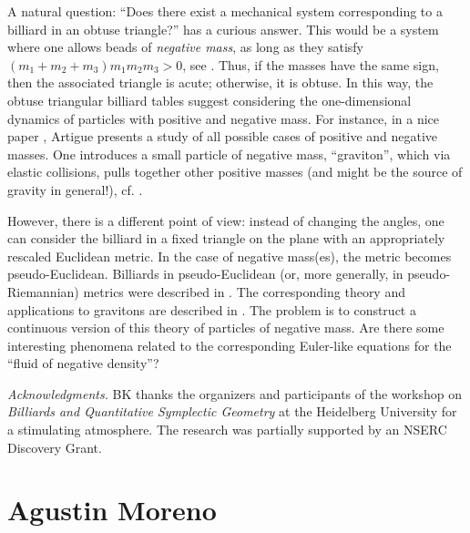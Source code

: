 \documentclass[11pt]{article}
\theoremstyle{definition}
\begin{document}
A natural question: ``Does there exist a mechanical system corresponding to a billiard in an obtuse triangle?'' has a curious answer. This would be a system where one allows beads of {\it negative mass}, as long as they satisfy $(m_1 + m_2 + m_3)m_1 m_2 m_3 > 0$, see \cite{GlashowMittag}. Thus, if the masses have the same sign, then the associated triangle is acute; otherwise, it is obtuse. In this way, the obtuse triangular billiard tables suggest considering the one-dimensional dynamics of particles with positive and negative mass. For instance, in a nice paper \cite{Artigue}, Artigue presents a study of all possible cases of positive and negative masses. One 
introduces a small particle of negative mass, ``graviton'', which via elastic collisions, pulls together other positive masses (and might be the source of gravity in general!), cf.  \cite{Wiki}.

However, there is a different point of view: instead of changing the angles, one can consider the billiard in a fixed triangle on the plane with an appropriately rescaled Euclidean metric. In the case of negative mass(es), the metric becomes pseudo-Euclidean. Billiards in pseudo-Euclidean (or, more generally, in pseudo-Riemannian) 
metrics were described in \cite{KhTab}. The corresponding theory and applications to gravitons are described in \cite{Artigue}. 
The problem is to construct a continuous version of this theory of particles of negative mass. Are there some interesting phenomena related to the corresponding Euler-like equations for the ``fluid of negative density''?


\bigskip


{\it Acknowledgments.} BK thanks the organizers and participants of the workshop on {\it Billiards and Quantitative Symplectic Geometry} at the Heidelberg University for a stimulating atmosphere. The research was partially supported by an NSERC Discovery Grant.




\section*{Agustin Moreno}
\end{document}
